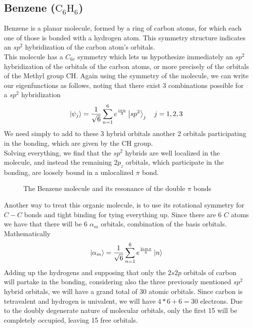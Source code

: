 \documentclass[../qm.tex]{subfiles}
\begin{document}
	\subsection{Benzene ($\mathrm{C_6H_6}$)}
	Benzene is a planar molecule, formed by a ring of carbon atoms, for which each one of those is bonded with a hydrogen atom. This symmetry structure indicates an $sp^2$ hybridization of the carbon atom's orbitals.\\
	This molecule has a $C_{6v}$ symmetry which lets us hypothesize immediately an $sp^2$ hybridization of the orbitals of the carbon atoms, or more precisely of the orbitals of the Methyl group $\mathrm{CH}$. Again using the symmetry of the molecule, we can write our eigenfunctions as follows, noting that there exist 3 combinations possible for a $sp^2$ hybridization
	\begin{equation}
		\ket{\psi_j}=\frac{1}{\sqrt{6}}\sum_{n=1}^6e^{\frac{i\pi n}{3}}\ket{sp^2}_j\quad j=1,2,3
		\label{eq:benzeneeigenfunctions}
	\end{equation}
	We need simply to add to these 3 hybrid orbitals another 2 orbitals participating in the bonding, which are given by the $\mathrm{CH}$ group.\\
	Solving everything, we find that the $sp^2$ hybrids are well localized in the molecule, and instead the remaining $2p_z$ orbitals, which participate in the bonding, are loosely bound in a unlocalized $\pi$ bond.
	\begin{figure}[H]
		\centering
		\qquad\qquad{}
		\label{fig:benzene}
		\caption{The Benzene molecule and its resonance of the double $\pi$ bonds}
	\end{figure}
	Another way to treat this organic molecule, is to use its rotational symmetry for $C-C$ bonds and tight binding for tying everything up. Since there are 6 $C$ atoms we have that there will be 6 $\alpha_m$ orbitals, combination of the basis orbitals. Mathematically
	\begin{equation}
		\ket{\alpha_m}=\frac{1}{\sqrt{6}}\sum_{n=1}^6e^{\frac{2im\pi}{6}}\ket{n}
		\label{eq:carbonring}
	\end{equation}
	Adding up the hydrogens and supposing that only the $2s2p$ orbitals of carbon will partake in the bonding, considering also the three previously mentioned $sp^2$ hybrid orbitals, we will have a grand total of 30 atomic orbitals. Since carbon is tetravalent and hydrogen is univalent, we will have $4*6+6=30$ electrons. Due to the doubly degenerate nature of molecular orbitals, only the first 15 will be completely occupied, leaving 15 free orbitals.\\
\end{document}
